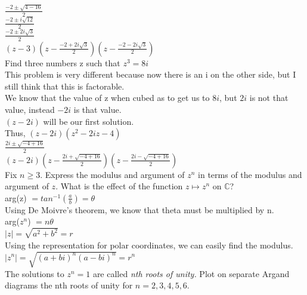 \documentclass[12pt]{article}
\begin{document}
$\frac{-2 \pm \sqrt{4 - 16}}{2}$\\
$\frac{-2 \pm i\sqrt{12}}{2}$\\
$\frac{-2 \pm 2i\sqrt{3}}{2}$\\


$(z-3)(z - \frac{-2 + 2i\sqrt{3}}{2})(z - \frac{-2 - 2i\sqrt{3}}{2})$\\

 Find three numbers z such that $z^3 = 8i$\\

This problem is very different because now there is an i on the other side, but I still think that this is factorable.\\

We know that the value of z when cubed as to get us to $8i$, but $2i$ is not that value, instead $-2i$ is that value.\\

$(z-2i)$ will be our first solution.\\

Thus,
$(z-2i)(z^2 - 2iz - 4)$\\

$\frac{2i \pm \sqrt{-4 + 16}}{2}$\\

$(z-2i)(z - \frac{2i + \sqrt{-4 + 16}}{2})(z - \frac{2i - \sqrt{-4 + 16}}{2})$\\



Fix $n \geq 3$. Express the modulus and argument of $z^n$ in terms of the modulus and argument of $z$. What is the effect of the function $z \mapsto z^n$ on $\mathbb{C}$?\\

arg(z) $ = tan^{-1}(\frac{a}{b}) = \theta$\\

Using De Moivre's theorem, we know that theta must be multiplied by n.\\
arg($z^n$) $ =  n\theta$\\


$|z| = \sqrt{a^2+b^2} = r$\\

Using the representation for polar coordinates, we can easily find the modulus.\\
$|z^n| = \sqrt{(a+bi)^n(a-bi)^n} = r^n$\\

The solutions to $z^n = 1$ are called \textit{nth roots of unity.} Plot on separate Argand diagrams the nth roots of unity for $n = 2,3,4,5,6$.\\
\end{document}
